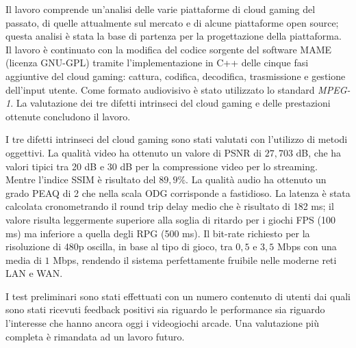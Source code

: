 Il lavoro comprende un'analisi delle varie piattaforme di cloud gaming del passato, di quelle attualmente sul mercato e di alcune piattaforme open source; questa analisi è stata la base di partenza per la progettazione della piattaforma. Il lavoro è continuato con la modifica del codice sorgente del software MAME (licenza GNU-GPL) tramite l'implementazione in C++ delle cinque fasi aggiuntive del cloud gaming: cattura, codifica, decodifica, trasmissione e gestione dell'input utente. Come formato audiovisivo è stato utilizzato lo standard \textit{MPEG-1}. La valutazione dei tre difetti intrinseci del cloud gaming e delle prestazioni ottenute concludono il lavoro.

I tre difetti intrinseci del cloud gaming sono stati valutati con l'utilizzo di metodi oggettivi.
La qualità video ha ottenuto un valore di PSNR di $27,703$ \si{dB}, che ha valori tipici tra 20 \si{dB} e 30 \si{dB} per la compressione video per lo streaming. Mentre l'indice SSIM è risultato del $89,9\%$.
La qualità audio ha ottenuto un grado PEAQ di 2 che nella scala ODG corrisponde a fastidioso.
La latenza è stata calcolata cronometrando il round trip delay medio che è risultato di 182 ms; il valore risulta leggermente superiore alla soglia di ritardo per i giochi FPS (100 ms) ma inferiore a quella degli RPG (500 ms).
Il bit-rate richiesto per la risoluzione di 480p oscilla, in base al tipo di gioco, tra $0,5$ e $3,5$ Mbps con una media di $1$ Mbps, rendendo il sistema perfettamente fruibile nelle moderne reti LAN e WAN.

I test preliminari sono stati effettuati con un numero contenuto di utenti dai quali sono stati ricevuti feedback positivi sia riguardo le performance sia riguardo l'interesse che hanno ancora oggi i videogiochi arcade. Una valutazione più completa è rimandata ad un lavoro futuro.

